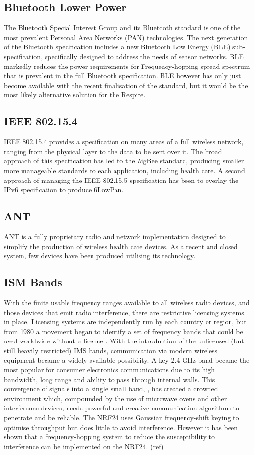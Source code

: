 \subsection{Bluetooth Lower Power}
The Bluetooth Special Interest Group and its Bluetooth standard is one of the most prevalent
Personal Area Networks (PAN) technologies. The next generation of the Bluetooth specification
includes a new Bluetooth Low Energy (BLE) sub-specification, specifically designed to address the
needs of sensor networks. BLE markedly reduces the power requirements for Frequency-hopping
spread spectrum that is prevalent in the full Bluetooth specification. BLE however has only just
become available with the recent finalisation of the standard, but it would be the most likely
alternative solution for the Respire.


\subsection{IEEE 802.15.4}
IEEE 802.15.4 provides a specification on many areas of a full wireless network, ranging from the
physical layer to the data to be sent over it. The broad approach of this specification has led to the
ZigBee standard, producing smaller more manageable standards to each application, including
health care. A second approach of managing the IEEE 802.15.5 specification has been to overlay the
IPv6 specification to produce 6LowPan.


\subsection{ANT}
ANT is a fully proprietary radio and network implementation designed to simplify the production of
wireless health care devices. As a recent and closed system, few devices have been produced
utilising its technology.


\subsection{\acf{ISM} Bands}
With the finite usable frequency ranges available to all wireless radio devices, and those devices that
emit radio interference, there are restrictive licensing systems in place. Licensing systems are
independently run by each country or region, but from 1980 a movement began to identify a set of
frequency bands that could be used worldwide without a licence \cite{ISMGen}.
With the introduction of the unlicensed (but still heavily restricted) \ac{IMS} bands,
communication via modern wireless equipment became a
widely-available possibility. A key 2.4 GHz band became the most popular for consumer electronics
communications due to its high bandwidth, long range and ability to pass through internal walls. This
convergence of signals into a single small band, , has created a crowded environment which,
compounded by the use of microwave ovens and other interference devices, needs powerful and
creative communication algorithms to penetrate and be reliable. The NRF24 uses Gaussian
frequency-shift keying to optimise throughput but does little to avoid interference. However it has
been shown that a frequency-hopping system to reduce the susceptibility to interference can be
implemented on the NRF24. (ref)


